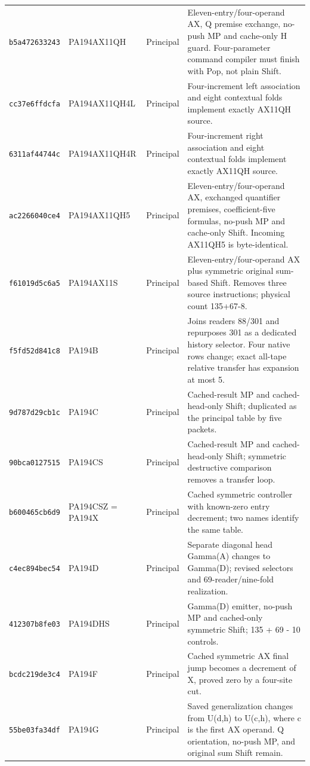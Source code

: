 {\begin{longtable}{@{}>{\raggedright\arraybackslash}p{}>{\raggedright\arraybackslash}p{}>{\raggedright\arraybackslash}p{}>{\raggedright\arraybackslash}p{}@{}}
\texttt{b5a472633243} & PA194AX11QH & Principal & Eleven-entry/four-operand AX, Q premise exchange, no-push MP and cache-only H guard. Four-parameter command compiler must finish with Pop, not plain Shift.\\[3pt]
\texttt{cc37e6ffdcfa} & PA194AX11QH4L & Principal & Four-increment left association and eight contextual folds implement exactly AX11QH source.\\[3pt]
\texttt{6311af44744c} & PA194AX11QH4R & Principal & Four-increment right association and eight contextual folds implement exactly AX11QH source.\\[3pt]
\texttt{ac2266040ce4} & PA194AX11QH5 & Principal & Eleven-entry/four-operand AX, exchanged quantifier premises, coefficient-five formulas, no-push MP and cache-only Shift. Incoming AX11QH5 is byte-identical.\\[3pt]
\texttt{f61019d5c6a5} & PA194AX11S & Principal & Eleven-entry/four-operand AX plus symmetric original sum-based Shift. Removes three source instructions; physical count 135+67-8.\\[3pt]
\texttt{f5fd52d841c8} & PA194B & Principal & Joins readers 88/301 and repurposes 301 as a dedicated history selector. Four native rows change; exact all-tape relative transfer has expansion at most 5.\\[3pt]
\texttt{9d787d29cb1c} & PA194C & Principal & Cached-result MP and cached-head-only Shift; duplicated as the principal table by five packets.\\[3pt]
\texttt{90bca0127515} & PA194CS & Principal & Cached-result MP and cached-head-only Shift; symmetric destructive comparison removes a transfer loop.\\[3pt]
\texttt{b600465cb6d9} & PA194CSZ = PA194X & Principal & Cached symmetric controller with known-zero entry decrement; two names identify the same table.\\[3pt]
\texttt{c4ec894bec54} & PA194D & Principal & Separate diagonal head Gamma(A) changes to Gamma(D); revised selectors and 69-reader/nine-fold realization.\\[3pt]
\texttt{412307b8fe03} & PA194DHS & Principal & Gamma(D) emitter, no-push MP and cached-only symmetric Shift; 135 + 69 - 10 controls.\\[3pt]
\texttt{bcdc219de3c4} & PA194F & Principal & Cached symmetric AX final jump becomes a decrement of X, proved zero by a four-site cut.\\[3pt]
\texttt{55be03fa34df} & PA194G & Principal & Saved generalization changes from U(d,h) to U(c,h), where c is the first AX operand. Q orientation, no-push MP, and original sum Shift remain.\\[3pt]

\end{longtable}}
